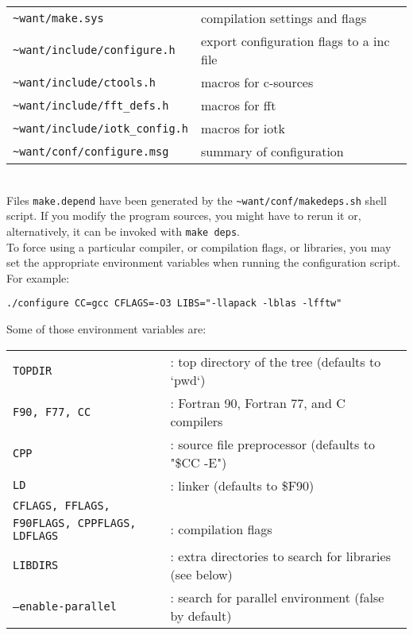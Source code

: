 %
%
\begin{tabular}{ll}
  \texttt{\~{}want/make.sys}            &     {compilation settings and flags}\\
  \texttt{\~{}want/include/configure.h} &     {export configuration flags to a inc file}\\
  \texttt{\~{}want/include/ctools.h}    &     {macros for c-sources}\\
  \texttt{\~{}want/include/fft\_defs.h} &     {macros for fft}\\
  \texttt{\~{}want/include/iotk\_config.h} &  {macros for iotk}\\
  \texttt{\~{}want/conf/configure.msg}  &     {summary of configuration}\\
\end{tabular}
%
%
\\

\noindent Files {\tt make.depend} have been generated by the
{\tt \~{}want/conf/makedeps.sh} shell script. If you modify the program sources,
you might have to rerun it or, alternatively, it can be invoked with
{\tt make deps}.  \\

\noindent To force using a particular compiler, or compilation
flags, or libraries, you may set the appropriate environment
variables when running the configuration script.  For example:

%
%
\begin{description}
  \item {\tt ./configure CC=gcc CFLAGS=-O3 LIBS="-llapack -lblas
  -lfftw" }
\end{description}
%
%

\noindent Some of those environment variables are: \\

%
%
\begin{tabular}{ll}
  \texttt{TOPDIR}       &{: top directory of the \WANT{} tree (defaults to `pwd`)}\\
  \texttt{F90, F77, CC} &{: Fortran 90, Fortran 77, and C compilers}\\
  \texttt{CPP}          &{: source file preprocessor (defaults to "\$CC -E")}\\
  \texttt{LD}           &{: linker (defaults to \$F90)}\\
  \texttt{CFLAGS, FFLAGS,}  &  \\
  \texttt{F90FLAGS, CPPFLAGS, LDFLAGS} &{: compilation flags}\\
  \texttt{LIBDIRS}      &{: extra directories to search for libraries (see below)}\\
  \texttt{--enable-parallel}   &{: search for parallel environment (false by default)}\\
\end{tabular}
%
%
\\


